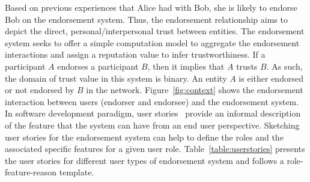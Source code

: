 Based on previous experiences that Alice had with Bob, she is likely to endorse
Bob on the endorsement system. Thus, the endorsement relationship aims to
depict the direct, personal/interpersonal trust between entities. The
endorsement system seeks to offer a simple computation model to aggregate the
endorsement interactions and assign a reputation value to infer
trustworthiness. If a participant $A$ endorses a participant $B$, then it
implies that $A$ trusts $B$. As such, the domain of trust value in this system
is binary. An entity $A$ is either endorsed or not endorsed by $B$ in the
network.  Figure~\ref{fig:context} shows the endorsement interaction between
users (endorser and endorsee) and the endorsement system.  In software
development paradigm, user stories~\cite{cohn2004user} provide an informal
description of the feature that the system can have from an end user
perspective. Sketching user stories for the endorsement system can help to
define the roles and the associated specific features for a given user role.
Table~\ref{table:userstories} presents the user stories for different user
types of endorsement system and follows a role-feature-reason
template. 

